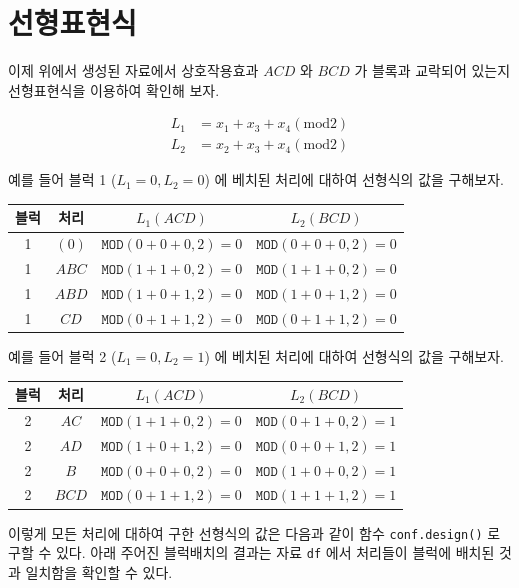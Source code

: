 \documentclass[
]{book}
\begin{document}
\hypertarget{uxc120uxd615uxd45cuxd604uxc2dd}{%
\section{선형표현식}\label{uxc120uxd615uxd45cuxd604uxc2dd}}

이제 위에서 생성된 자료에서 상호작용효과 \(ACD\) 와 \(BCD\) 가 블록과 교락되어 있는지
선형표현식을 이용하여 확인해 보자.

\begin{align*}
L_1 & = x_1 + x_3 + x_4 (\text{mod}2) \\
L_2 & = x_2 + x_3 + x_4 (\text{mod}2)
\end{align*}

예를 들어 블럭 1 (\(L_1=0, L_2=0\)) 에 베치된 처리에 대하여 선형식의 값을 구해보자.

\begin{longtable}[]{@{}cccc@{}}
\toprule
블럭 & 처리 & \(L_1 (ACD)\) & \(L_2 (BCD)\)\tabularnewline
\midrule
\endhead
1 & \((0)\) & \(\texttt{MOD} (0+0+0, 2) = 0\) & \(\texttt{MOD} (0+0+0, 2) = 0\)\tabularnewline
1 & \(ABC\) & \(\texttt{MOD} (1+1+0, 2) = 0\) & \(\texttt{MOD} (1+1+0, 2) = 0\)\tabularnewline
1 & \(ABD\) & \(\texttt{MOD} (1+0+1, 2) = 0\) & \(\texttt{MOD} (1+0+1, 2) = 0\)\tabularnewline
1 & \(CD\) & \(\texttt{MOD} (0+1+1, 2) = 0\) & \(\texttt{MOD} (0+1+1, 2) = 0\)\tabularnewline
\bottomrule
\end{longtable}

예를 들어 블럭 2 (\(L_1=0, L_2=1\)) 에 베치된 처리에 대하여 선형식의 값을 구해보자.

\begin{longtable}[]{@{}cccc@{}}
\toprule
블럭 & 처리 & \(L_1 (ACD)\) & \(L_2 (BCD)\)\tabularnewline
\midrule
\endhead
2 & \(AC\) & \(\texttt{MOD} (1+1+0, 2) = 0\) & \(\texttt{MOD} (0+1+0, 2) = 1\)\tabularnewline
2 & \(AD\) & \(\texttt{MOD} (1+0+1, 2) = 0\) & \(\texttt{MOD} (0+0+1, 2) = 1\)\tabularnewline
2 & \(B\) & \(\texttt{MOD} (0+0+0, 2) = 0\) & \(\texttt{MOD} (1+0+0, 2) = 1\)\tabularnewline
2 & \(BCD\) & \(\texttt{MOD} (0+1+1, 2) = 0\) & \(\texttt{MOD} (1+1+1, 2) = 1\)\tabularnewline
\bottomrule
\end{longtable}

이렇게 모든 처리에 대하여 구한 선형식의 값은 다음과 같이 함수 \texttt{conf.design()} 로 구할 수 있다.
아래 주어진 블럭배치의 결과는 자료 \texttt{df} 에서 처리들이 블럭에 배치된 것과 일치함을 확인할 수 있다.
\end{document}
